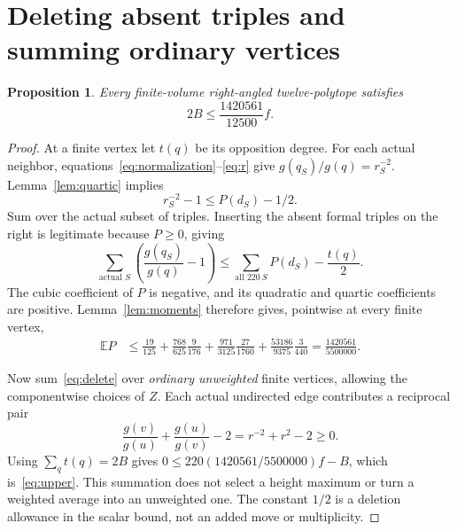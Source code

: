 \documentclass[11pt]{article}
\newtheorem{proposition}[theorem]{Proposition}
\newcommand{\EE}{\mathbb E}
\begin{document}
\section{Deleting absent triples and summing ordinary vertices}
\begin{proposition}\label{prop:upper}
Every finite-volume right-angled twelve-polytope satisfies
\begin{equation}\label{eq:upper}
 2B\le\frac{1420561}{12500}f.
\end{equation}
\end{proposition}
\begin{proof}
At a finite vertex let $t(q)$ be its opposition degree. For each
actual neighbor, equations~\eqref{eq:normalization}--\eqref{eq:r}
give $g(q_S)/g(q)=r_S^{-2}$. Lemma~\ref{lem:quartic} implies
\[
 r_S^{-2}-1\le P(d_S)-1/2.
\]
Sum over the actual subset of triples. Inserting the absent formal
triples on the right is legitimate because $P\ge0$, giving
\begin{equation}\label{eq:delete}
 \sum_{\text{actual }S}\left(\frac{g(q_S)}{g(q)}-1\right)
 \le\sum_{\text{all }220\ S}P(d_S)-\frac{t(q)}2.
\end{equation}
The cubic coefficient of $P$ is negative, and its quadratic and
quartic coefficients are positive. Lemma~\ref{lem:moments} therefore
gives, pointwise at every finite vertex,
\begin{align}
 \EE P&\le\frac{19}{125}
  +\frac{768}{625}\frac9{176}
  +\frac{971}{3125}\frac{27}{1760}
  +\frac{53186}{9375}\frac3{440}
  =\frac{1420561}{5500000}.\label{eq:Pmean}
\end{align}

Now sum~\eqref{eq:delete} over \emph{ordinary unweighted} finite
vertices, allowing the componentwise choices of $Z$. Each actual
undirected edge contributes a reciprocal pair
\[
 \frac{g(v)}{g(u)}+\frac{g(u)}{g(v)}-2=r^{-2}+r^2-2\ge0.
\]
Using $\sum_q t(q)=2B$ gives
$0\le220(1420561/5500000)f-B$, which is~\eqref{eq:upper}.
This summation does not select a height maximum or turn a weighted
average into an unweighted one. The constant $1/2$ is a deletion
allowance in the scalar bound, not an added move or multiplicity.
\end{proof}
\end{document}
